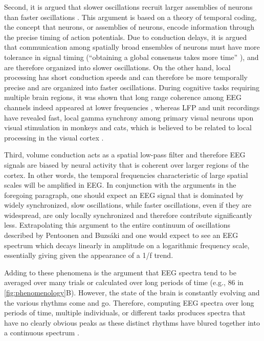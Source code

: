 Second, it is argued that slower oscillations recruit larger assemblies of neurons than faster oscillations \cite{Buzsaki2006, Buzsaki2012c, Buzsaki2010}. This argument is based on a theory of temporal coding, the concept that neurons, or assemblies of neurons, encode information through the precise timing of action potentials. Due to conduction delays, it is argued that communication among spatially broad ensembles of neurons must have more tolerance in signal timing (``obtaining a global consensus takes more time'' \cite{Buzsaki2006}), and are therefore organized into slower oscillations. On the other hand, local processing has short conduction speeds and can therefore be more temporally precise and are organized into faster oscillations. During cognitive tasks requiring multiple brain regions, it was shown that long range coherence among EEG channels indeed appeared at lower frequencies \cite{Sarnthein1998,VonStein1999}, whereas LFP and unit recordings have revealed fast, local gamma synchrony among primary visual neurons upon visual stimulation in monkeys and cats, which is believed to be related to local processing in the visual cortex \cite{Gray1989,Eckhorn1994}.

Third, volume conduction acts as a spatial low-pass filter \cite{Nunez2006} and therefore EEG signals are biased by neural activity that is coherent over larger regions of the cortex. In other words, the temporal frequencies characteristic of large spatial scales will be amplified in EEG. In conjunction with the arguments in the foregoing paragraph, one should expect an EEG signal that is dominated by widely synchronized, slow oscillations, while faster oscillations, even if they are widespread, are only locally synchronized and therefore contribute significantly less. Extrapolating this argument to the entire continuum of oscillations described by Pentoonen and Buzsáki \cite{Penttonen2003} and one would expect to see an EEG spectrum which decays linearly in amplitude on a logarithmic frequency scale, essentially giving given the appearance of a 1/f trend.

Adding to these phenomena is the argument that EEG spectra tend to be averaged over many trials or calculated over long periods of time (e.g., \qty{86}{\min} in \autoref{fig:phenomenology}B). However, the state of the brain is constantly evolving and the various rhythms come and go. Therefore, computing EEG spectra over long periods of time, multiple individuals, or different tasks produces spectra that have no clearly obvious peaks as these distinct rhythms have blured together into a continuous spectrum \cite{Buzsaki2006}.

